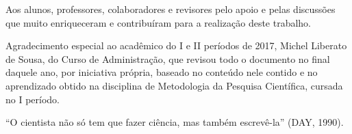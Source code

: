 \documentclass[a4paper,12pt]{article}  %
\begin{document}
\begin{ElementosPreTextuais}

\begin{FolhaDeRosto} %
\end{FolhaDeRosto}

\begin{Errata} %
\end{Errata}

\begin{FolhaDeAprovacao} %
\end{FolhaDeAprovacao}

\begin{Dedicatoria} %
\end{Dedicatoria}

\begin{Agradecimentos} %
Aos alunos, professores, colaboradores e revisores pelo apoio e pelas discussões que muito enriqueceram e contribuíram para a realização deste trabalho.

Agradecimento especial ao acadêmico do I e II períodos de 2017, Michel Liberato de Sousa, do Curso de Administração, que revisou todo o documento no final daquele ano, por iniciativa própria, baseado no conteúdo nele contido e no aprendizado obtido na disciplina de Metodologia da Pesquisa Científica, cursada no I período.
\end{Agradecimentos}

\begin{Epigrafe} %
“O cientista não só tem que fazer ciência, mas também escrevê-la” (DAY, 1990).
\end{Epigrafe}

\begin{Resumo} %
\end{Resumo}


\end{ElementosPreTextuais}
\end{document}
